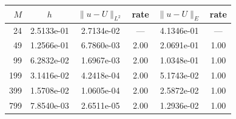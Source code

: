 \begin{tabular}{rccccc}
\toprule
$M$ & $h$ & $\|u-U\|_{L^2}$ & rate & $\|u-U\|_E$ & rate\\
\midrule
24 & 2.5133e-01 & 2.7134e-02 & --- & 4.1346e-01 & ---\\
49 & 1.2566e-01 & 6.7860e-03 & 2.00 & 2.0691e-01 & 1.00\\
99 & 6.2832e-02 & 1.6967e-03 & 2.00 & 1.0348e-01 & 1.00\\
199 & 3.1416e-02 & 4.2418e-04 & 2.00 & 5.1743e-02 & 1.00\\
399 & 1.5708e-02 & 1.0605e-04 & 2.00 & 2.5872e-02 & 1.00\\
799 & 7.8540e-03 & 2.6511e-05 & 2.00 & 1.2936e-02 & 1.00\\
\bottomrule
\end{tabular}
